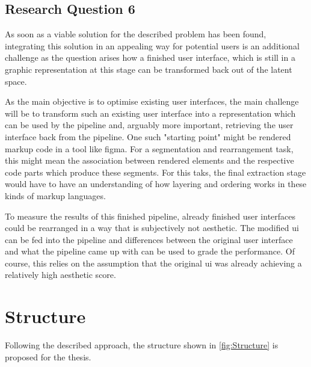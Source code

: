 \documentclass[10pt,a4paper]{scrartcl} %
\begin{document}
\subsection{Research Question 6}
As soon as a viable solution for the described problem has been found, integrating this solution in an appealing way for potential users is an additional challenge as the question arises how a finished user interface, which is still in a graphic representation at this stage can be transformed back out of the latent space.

As the main objective is to optimise existing user interfaces, the main challenge will be to transform such an existing user interface into a representation which can be used by the pipeline and, arguably more important, retrieving the user interface back from the pipeline. One such "starting point" might be rendered markup code in a tool like figma. For a segmentation and rearrangement task, this might mean the association between rendered elements and the respective code parts which produce these segments. For this taks, the final extraction stage would have to have an understanding of how layering and ordering works in these kinds of markup languages.

To measure the results of this finished pipeline, already finished user interfaces could be rearranged in a way that is subjectively not aesthetic. The modified \ac{ui} can be fed into the pipeline and differences between the original user interface and what the pipeline came up with can be used to grade the performance. Of course, this relies on the assumption that the original \ac{ui} was already achieving a relatively high aesthetic score.

\pagebreak
\section{Structure}
\label{sec:structure}
Following the described approach, the structure shown in \cref{fig:Structure} is proposed for the thesis.
\end{document}
